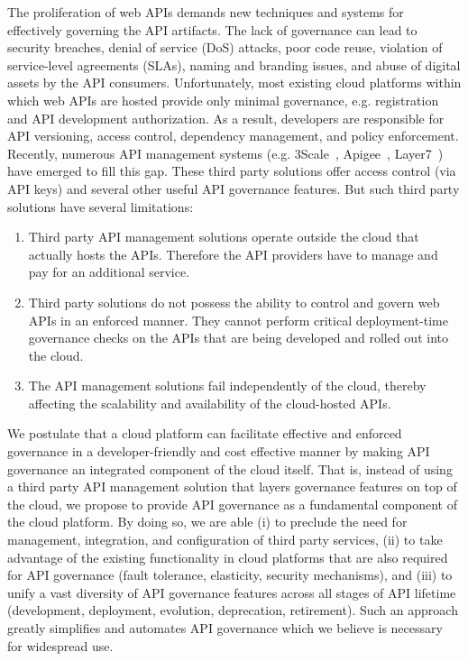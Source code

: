 The proliferation of web APIs demands new techniques and systems for 
effectively governing the API artifacts.
The lack of governance can lead to 
security breaches, denial of service (DoS)
attacks, poor code reuse, violation of service-level agreements (SLAs), 
naming and branding issues, and abuse of digital 
assets by the API consumers. Unfortunately, most existing cloud platforms
within which web APIs are hosted provide only minimal governance, e.g.
registration and API development authorization.
As a result, developers are responsible for API versioning, access control,
dependency management, and policy enforcement. Recently, numerous 
API management systems (e.g. 3Scale~\cite{3scale}, Apigee~\cite{apigee},
Layer7~\cite{layer7}) have emerged to fill this gap. 
These third party solutions offer access control
(via API keys) and 
several other useful API governance features. But such third party 
solutions have several limitations:
\begin{enumerate}
\item Third party API management solutions operate outside the cloud that actually hosts the APIs. Therefore 
the API providers have to manage and pay for an additional service.
\item Third party solutions do not possess the ability to control and govern web APIs in an enforced manner. They cannot perform 
critical deployment-time governance checks on the APIs that are being developed and rolled out into the cloud. 
\item The API management solutions fail independently of the cloud, thereby affecting the scalability and availability of the 
cloud-hosted APIs. 
\end{enumerate}

We postulate that a cloud platform can facilitate effective and 
enforced governance in a developer-friendly and cost effective manner by
making API governance an integrated component of the cloud itself. 
That is, instead of using a third party API management
solution that layers governance features on top of the cloud, 
we propose to provide API governance as a fundamental component of the cloud
platform.  By doing so, we are able (i) to preclude the need for management,
integration, and configuration of third party services, (ii) to take advantage
of the existing functionality in cloud platforms that are also required for 
API governance (fault tolerance, elasticity, security mechanisms), and (iii)
to unify a vast diversity of API
governance features across all stages of API lifetime
(development, deployment, evolution, deprecation, retirement). Such an
approach greatly simplifies and automates API governance which we believe
is necessary for widespread use.

